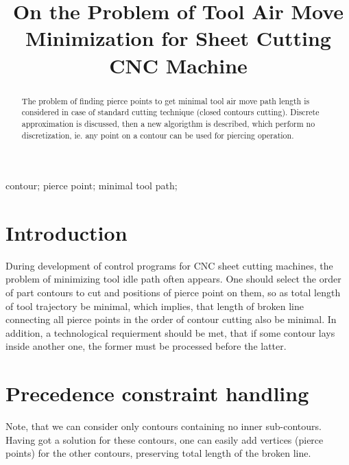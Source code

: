 \documentclass{../download/tPRS2e}
\begin{document}
\title{On the Problem of Tool Air Move Minimization for Sheet Cutting CNC Machine}

\author{
}

\maketitle

\begin{abstract}
The problem of finding pierce points to get
minimal tool air move path length is considered
in case of standard cutting technique
(closed contours cutting).
Discrete approximation is discussed,
then a new algorigthm is described,
which perform no discretization,
ie. any point on a contour can be 
used for piercing operation.
\end{abstract}

\begin{keywords}
    contour;
    pierce point;
    minimal tool path;
\end{keywords}

\section{Introduction}

During development of control programs for
CNC sheet cutting machines,
the problem of minimizing tool idle path
often appears.
One should select the order
of part contours to cut
and positions of pierce point on them,
so as total length of tool trajectory be minimal,
which implies,
that length of broken line connecting all
pierce points in the order of contour cutting
also be minimal.
In addition, a technological requierment should be met,
that if some contour lays inside another one,
the former must be processed before the latter.

\section{Precedence constraint handling}

Note, that we can consider
only contours containing no inner sub-contours.
Having got a solution for these contours,
one can easily add vertices
(pierce points) for the other contours,
preserving total length of the broken line.
\end{document}
